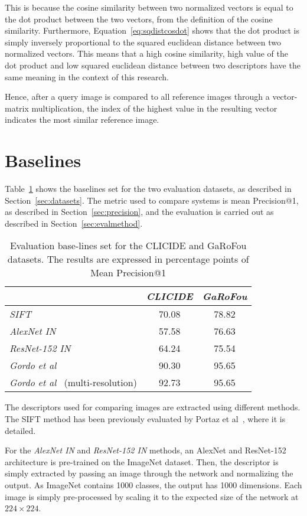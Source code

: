 This is because the cosine similarity between two normalized vectors is
equal to the dot product between the two vectors, from the definition
of the cosine similarity. Furthermore, Equation~\ref{eq:sqdistcosdot} shows
that the dot product is simply inversely proportional to the squared
euclidean distance between two normalized vectors.
This means that a high cosine similarity, high value of the dot product
and low squared euclidean distance between two descriptors have the
same meaning in the context of this research.

Hence, after a query image is compared to all reference images through
a vector-matrix multiplication, the index of the highest value in the
resulting vector indicates the most similar reference image.

\section{Baselines}\label{sec:baselines}
Table~\ref{tab:baselines} shows the baselines set for the two evaluation
datasets, as described in Section~\ref{sec:datasets}. The metric used
to compare systems is mean Precision@1, as described in
Section~\ref{sec:precision}, and the evaluation is carried out as
described in Section~\ref{sec:evalmethod}.

\begin{table}
\begin{tabular}{|l|c|c|}
\hline & \emph{CLICIDE} & \emph{GaRoFou}\\
\hline \emph{SIFT} & 70.08 & 78.82\\
\hline \emph{AlexNet IN} & 57.58 & 76.63\\
\hline \emph{ResNet-152 IN} & 64.24 & 75.54\\
\hline \emph{Gordo et al}~\cite{gordo_deep_2016} & 90.30 & 95.65\\
\hline \emph{Gordo et al}~\cite{gordo_deep_2016} (multi-resolution)
& 92.73 & 95.65\\
\hline
\end{tabular}
\caption{Evaluation base-lines set for the CLICIDE and GaRoFou datasets.
The results are expressed in percentage points of
Mean Precision@1\label{tab:baselines}}
\end{table}

The descriptors used for comparing images are extracted using different
methods.
The SIFT method has been previously evaluated by
Portaz et al~\cite{portaz_construction_nodate}, where it is detailed.

For the \emph{AlexNet IN} and \emph{ResNet-152 IN} methods,
an AlexNet and ResNet-152 architecture is pre-trained on the ImageNet dataset.
Then, the descriptor is simply extracted by passing an image through the
network and normalizing the output. As ImageNet contains 1000 classes, the
output has 1000 dimensions. Each image is simply pre-processed by scaling
it to the expected size of the network at $224 \times 224$.

